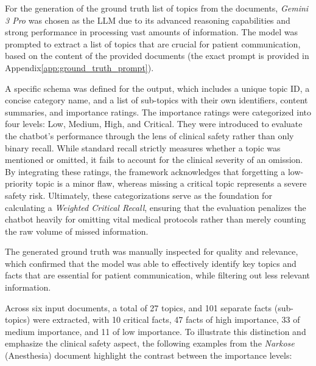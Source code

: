 For the generation of the ground truth list of topics from the documents, \textit{Gemini 3 Pro} was chosen as the LLM due to its advanced reasoning capabilities and strong performance in processing vast amounts of information.
The model was prompted to extract a list of topics that are crucial for patient communication, based on the content of the provided documents (the exact prompt is provided in Appendix\ref{app:ground_truth_prompt}).

A specific schema was defined for the output, which includes a unique topic ID, a concise category name, and a list of sub-topics with their own identifiers, content summaries, and importance ratings.
The importance ratings were categorized into four levels: Low, Medium, High, and Critical.
They were introduced to evaluate the chatbot's performance through the lens of clinical safety rather than only binary recall. 
While standard recall strictly measures whether a topic was mentioned or omitted, it fails to account for the clinical severity of an omission. 
By integrating these ratings, the framework acknowledges that forgetting a low-priority topic is a minor flaw, whereas missing a critical topic represents a severe safety risk. 
Ultimately, these categorizations serve as the foundation for calculating a \textit{Weighted Critical Recall}, ensuring that the evaluation penalizes the chatbot heavily for omitting vital medical protocols rather than merely counting the raw volume of missed information.  

The generated ground truth was manually inspected for quality and relevance, which confirmed that the model was able to effectively identify key topics and facts that are essential for patient communication, while filtering out less relevant information. 

Across six input documents, a total of 27 topics, and 101 separate facts (sub-topics) were extracted, with 10 critical facts, 47 facts of high importance, 33 of medium importance, and 11 of low importance. 
To illustrate this distinction and emphasize the clinical safety aspect, the following examples from the \textit{Narkose} (Anesthesia) document highlight the contrast between the importance levels:

